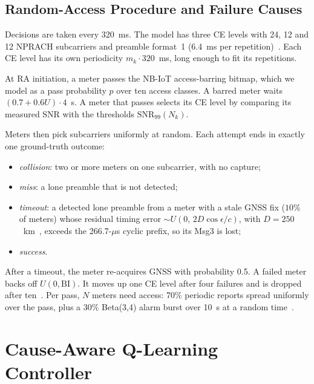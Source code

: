 \documentclass[conference]{IEEEtran}
\begin{document}
\subsection{Random-Access Procedure and Failure Causes}
Decisions are taken every 320~ms. The model has three CE levels with 24, 12 and 12 NPRACH subcarriers and preamble format~1 (6.4~ms per repetition)~\cite{3gpp36211}. Each CE level has its own periodicity $m_k\cdot 320$~ms, long enough to fit its repetitions.

At RA initiation, a meter passes the NB-IoT access-barring bitmap, which we model as a pass probability $p$ over ten access classes. A barred meter waits $(0.7+0.6U)\cdot 4$~s. A meter that passes selects its CE level by comparing its measured SNR with the thresholds $\mathrm{SNR}_{99}(N_k)$.

Meters then pick subcarriers uniformly at random. Each attempt ends in exactly one ground-truth outcome:
\begin{itemize}
\item \emph{collision}: two or more meters on one subcarrier, with no capture;
\item \emph{miss}: a lone preamble that is not detected;
\item \emph{timeout}: a detected lone preamble from a meter with a stale GNSS fix ($10\%$ of meters) whose residual timing error $\sim U(0,\,2D\cos\epsilon/c)$, with $D=250$~km~\cite{chougrani2022nbiot}, exceeds the 266.7-$\mu$s cyclic prefix, so its Msg3 is lost;
\item \emph{success}.
\end{itemize}
After a timeout, the meter re-acquires GNSS with probability 0.5. A failed meter backs off $U(0,\mathrm{BI})$. It moves up one CE level after four failures and is dropped after ten~\cite{3gpp36321,3gpp36331}. Per pass, $N$ meters need access: 70\% periodic reports spread uniformly over the pass, plus a 30\% Beta(3,4) alarm burst over 10~s at a random time~\cite{3gpp37868}.

\section{Cause-Aware Q-Learning Controller}
\end{document}
